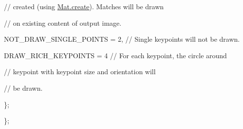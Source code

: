 {\ttfamily // created (using \mbox{\hyperlink{classorg_1_1opencv_1_1core_1_1_mat_a539b0a3690afb6b43047b50cbb787fee}{Mat.\+create}}). Matches will be drawn}

{\ttfamily }

{\ttfamily }

{\ttfamily // on existing content of output image.}

{\ttfamily }

{\ttfamily }

{\ttfamily N\+O\+T\+\_\+\+D\+R\+A\+W\+\_\+\+S\+I\+N\+G\+L\+E\+\_\+\+P\+O\+I\+N\+TS = 2, // Single keypoints will not be drawn.}

{\ttfamily }

{\ttfamily }

{\ttfamily D\+R\+A\+W\+\_\+\+R\+I\+C\+H\+\_\+\+K\+E\+Y\+P\+O\+I\+N\+TS = 4 // For each keypoint, the circle around}

{\ttfamily }

{\ttfamily }

{\ttfamily // keypoint with keypoint size and orientation will}

{\ttfamily }

{\ttfamily }

{\ttfamily // be drawn.}

{\ttfamily }

{\ttfamily }

{\ttfamily \};}

{\ttfamily }

{\ttfamily }

{\ttfamily \};}

{\ttfamily }

{\ttfamily }

{\ttfamily }


